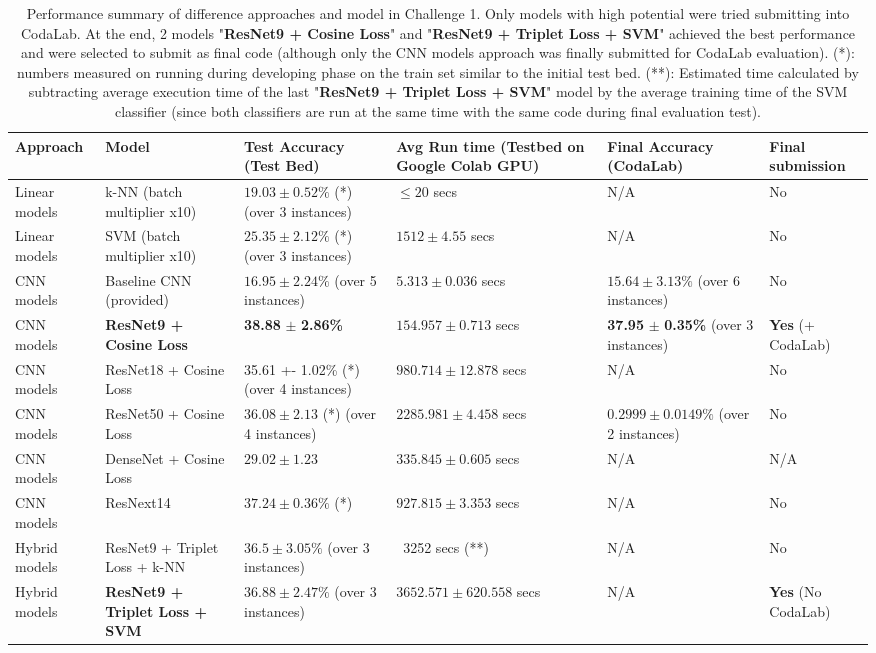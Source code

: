 \documentclass[10pt,twocolumn,letterpaper]{article}
\begin{document}
\begin{table*}[h!]
    \caption{Performance summary of difference approaches and model in Challenge 1. Only models with high potential were tried submitting into CodaLab. At the end, 2 models "\textbf{ResNet9 + Cosine Loss}" and "\textbf{ResNet9 + Triplet Loss + SVM}" achieved the best performance and were selected to submit as final code (although only the CNN models approach was finally submitted for CodaLab evaluation).
    (*): numbers measured on running during developing phase on the train set similar to the initial test bed.
    (**): Estimated time calculated by subtracting average execution time of the last "\textbf{ResNet9 + Triplet Loss + SVM}" model by the average training time of the SVM classifier (since both classifiers are run at the same time with the same code during final evaluation test). 
    }
    \label{table:result_challenge1}
    \centering
    \begin{tabular}{|p{1.5cm}|p{3cm}|p{3cm}|p{3cm}|p{3cm}|p{1cm}|}
        \hline
        Approach & Model & Test Accuracy (Test Bed)  & Avg Run time (Testbed on Google Colab GPU) & Final Accuracy (CodaLab)  & Final submission\\

        \hline
       Linear models & k-NN (batch multiplier x10) & \(19.03 \pm 0.52\%\) (*) (over 3 instances) & \(\le20\) secs & N/A & No\\
       \hline
        Linear models & SVM (batch multiplier x10) & \(25.35 \pm 2.12\%\) (*) (over 3 instances) & \(1512 \pm 4.55\) secs  & N/A & No\\
        \hline
        CNN models & Baseline CNN (provided) & \(16.95 \pm 2.24\%\) (over 5 instances) & \(5.313 \pm 0.036\) secs & \(15.64 \pm 3.13\%\) (over 6 instances) & No \\
        
        \hline
        
        CNN models & \textbf{ResNet9 + Cosine Loss} & \textbf{38.88} \(\pm\) \textbf{2.86\%} & \(154.957 \pm 0.713\) secs & \textbf{37.95} \(\pm\) \textbf{0.35\%} (over 3 instances) & \textbf{Yes} (+ CodaLab)\\
 \hline
     CNN models & ResNet18 + Cosine Loss & 35.61 +- 1.02\% (*) (over 4 instances) & \(980.714 \pm 12.878\) secs & N/A  &    No\\
    \hline
    CNN models & ResNet50 + Cosine Loss & \(36.08 \pm 2.13\) (*) (over 4 instances) & \(2285.981 \pm 4.458\) secs  & \(0.2999 \pm 0.0149\%\) (over 2 instances)
 & No\\
    \hline
     CNN models& DenseNet + Cosine Loss & \(29.02 \pm 1.23\) & \(335.845 \pm 0.605\) secs  &  N/A & N/A \\
    \hline
    CNN models& ResNext14 & \(37.24 \pm 0.36\%\) (*) & \(927.815 \pm3.353\) secs & N/A & No\\
    \hline
    Hybrid models & ResNet9 + Triplet Loss + k-NN & \(36.5 \pm 3.05\%\)  (over 3 instances) & ~3252 secs (**)  & N/A & No\\
    \hline
    Hybrid models& \textbf{ResNet9 + Triplet Loss + SVM }& \(36.88 \pm 2.47\%\) (over 3 instances)& \(3652.571 \pm 620.558\) secs & N/A & \textbf{Yes} (No CodaLab) \\


\end{tabular}
\end{table*}
\end{document}
